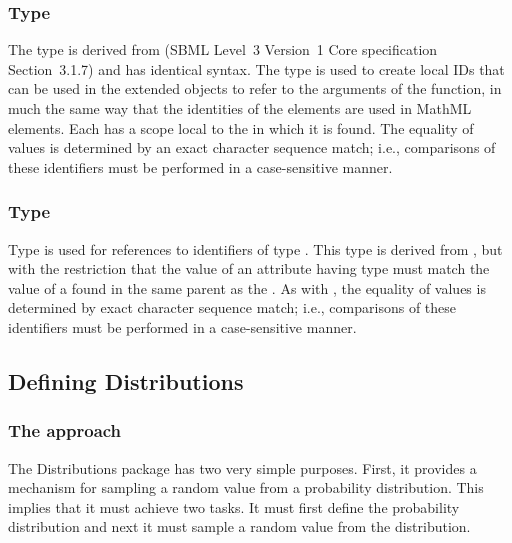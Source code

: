 \documentclass[draftspec]{sbmlpkgspec}
\newcommand{\fixttspace}{\hspace*{1pt}}
\newcommand{\sbmlthreecore}{SBML Level~3 Version~1 Core\xspace}
\newcommand{\distrib}{Distributions\xspace}
\begin{document}
\subsubsection{Type \fixttspace{}}
\label{primtype-portid}

The type  is derived from  (\sbmlthreecore specification Section~3.1.7) and has identical syntax.  The  type is used to create local IDs that can be used in the extended \FunctionDefinition objects to refer to the arguments of the function, in much the same way that the identities of the  elements are used in MathML  elements.  Each  has a scope local to the \FunctionDefinition in which it is found.  The
equality of  values is determined by an exact
character sequence match; i.e., comparisons of these identifiers must be
performed in a case-sensitive manner.


\subsubsection{Type \fixttspace{}}
\label{primtype-portidref}

Type  is used for references to
identifiers of type .  This type is derived from
, but with the restriction that the value of an
attribute having type  must match the value of a
 found in the same parent \FunctionDefinition as the
.  As with , the equality of
 values is determined by exact character sequence
match; i.e., comparisons of these identifiers must be performed in a
case-sensitive manner.



\subsection{Defining Distributions}

\subsubsection{The approach}

The \distrib package has two very simple purposes. First, it provides a
mechanism for sampling a random value from a probability
distribution. This implies that it must achieve two tasks. It must
first define the probability distribution and next it must sample a
random value from the distribution.
\end{document}
